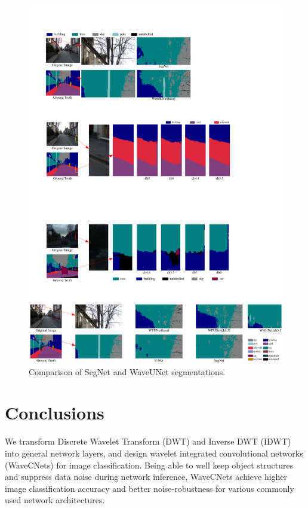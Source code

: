 \documentclass[10pt,twocolumn,letterpaper]{article}
\begin{document}
\begin{figure}[bpt]
	\centering
	\includegraphics*[scale=0.7, viewport=40 616 382 776]{figures/Visio-detail_comparison.pdf}
	\caption{Comparison of SegNet and WaveUNet segmentations.}
	\label{Fig_Segmentation_Comparison}
\end{figure}


\section{Conclusions}
We transform Discrete Wavelet Transform (DWT) and Inverse DWT (IDWT) into general network layers,
and design wavelet integrated convolutional networks (WaveCNets) for image classification.
Being able to well keep object structures and suppress data noise during network inference,
WaveCNets achieve higher image classification accuracy and better noise-robustness
for various commonly used network architectures.
\end{document}
